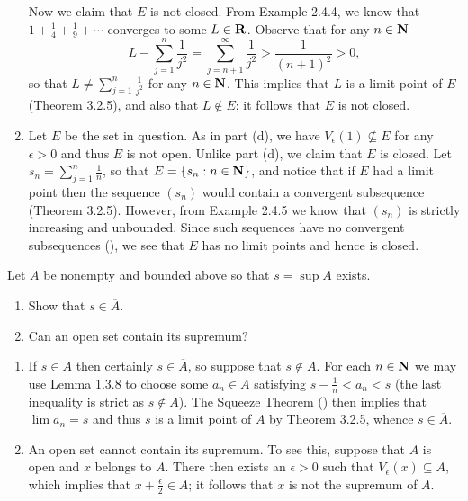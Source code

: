 \documentclass{lew98_solutions}
\begin{document}
\begin{solution}
\begin{enumerate}
        Now we claim that \( E \) is not closed. From Example 2.4.4, we know that \( 1 + \tfrac{1}{4} + \tfrac{1}{9} + \cdots \) converges to some \( L \in \mathbf{R} \). Observe that for any \( n \in \mathbf{N} \)
        \[
            L - \sum_{j=1}^n \frac{1}{j^2} = \sum_{j=n+1}^{\infty} \frac{1}{j^2} > \frac{1}{(n+1)^2} > 0,
        \]
        so that \( L \neq \sum_{j=1}^n \tfrac{1}{j^2} \) for any \( n \in \mathbf{N} \). This implies that \( L \) is a limit point of \( E \) (Theorem 3.2.5), and also that \( L \not\in E \); it follows that \( E \) is not closed.

        \item Let \( E \) be the set in question. As in part (d), we have \( V_{\epsilon}(1) \not\subseteq E \) for any \( \epsilon > 0 \) and thus \( E \) is not open. Unlike part (d), we claim that \( E \) is closed. Let \( s_n = \sum_{j=1}^n \tfrac{1}{n} \), so that \( E = \{ s_n : n \in \mathbf{N} \} \), and notice that if \( E \) had a limit point then the sequence \( (s_n) \) would contain a convergent subsequence (Theorem 3.2.5). However, from Example 2.4.5 we know that \( (s_n) \) is strictly increasing and unbounded. Since such sequences have no convergent subsequences (), we see that \( E \) has no limit points and hence is closed.
    \end{enumerate}
\end{solution}

\begin{exercise}
\label{ex:3.2.4}
    Let \( A \) be nonempty and bounded above so that \( s = \sup A \) exists.
    \begin{enumerate}
        \item Show that \( s \in \overline{A} \).

        \item Can an open set contain its supremum?
    \end{enumerate}
\end{exercise}

\begin{solution}
    \begin{enumerate}
        \item If \( s \in A \) then certainly \( s \in \overline{A} \), so suppose that \( s \not\in A \). For each \( n \in \mathbf{N} \) we may use Lemma 1.3.8 to choose some \( a_n \in A \) satisfying \( s - \tfrac{1}{n} < a_n < s \) (the last inequality is strict as \( s \not\in A \)). The Squeeze Theorem () then implies that \( \lim a_n = s \) and thus \( s \) is a limit point of \( A \) by Theorem 3.2.5, whence \( s \in \overline{A} \).

        \item An open set cannot contain its supremum. To see this, suppose that \( A \) is open and \( x \) belongs to \( A \). There then exists an \( \epsilon > 0 \) such that \( V_{\epsilon}(x) \subseteq A \), which implies that \( x + \tfrac{\epsilon}{2} \in A \); it follows that \( x \) is not the supremum of \( A \).
    \end{enumerate}
\end{solution}
\end{document}
